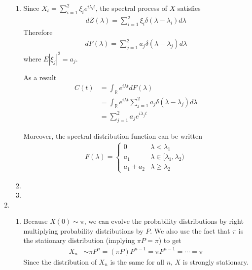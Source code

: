 \documentclass[12pt]{article}
\theoremstyle{plain}
\theoremstyle{definition}
\theoremstyle{remark}
\begin{document}
\begin{enumerate}
\begin{enumerate}
      \item %
        Since $X_t = \sum^2_{i=1}\xi_i e^{i\lambda_i t}$,
        the spectral process of $X$ satisfies
        \begin{align*}
          dZ(\lambda) = \sum^2_{i=1} \xi_i \delta(\lambda -\lambda_i) d\lambda
        \end{align*}
        Therefore
        \begin{align*}
          dF(\lambda) = \sum^2_{j=1} a_j \delta(\lambda -\lambda_j) d\lambda
        \end{align*}
        where $E|\xi_j|^2 = a_j$.

        As a result
        \begin{align*}
          C(t) &= \int_\mathbb{R} e^{i\lambda t} dF(\lambda) \\
            &= \int_\mathbb{R} e^{i\lambda t}
              \sum^2_{j=1} a_j \delta(\lambda -\lambda_j) d\lambda \\
            &= \sum^2_{j=1} a_j e^{i\lambda_j t}
        \end{align*}

        Moreover, the spectral distribution function can be written
        \begin{align*}
         F(\lambda) =
          \begin{cases}
            0 & \lambda < \lambda_1 \\
            a_1 & \lambda \in [\lambda_1,\lambda_2)\\
            a_1+a_2 & \lambda \geq \lambda_2
          \end{cases}
        \end{align*}

      \item %
      \item %

    \end{enumerate}

  \item %
    \begin{enumerate}
      \item %
        Because $X(0)\sim \pi$, we can evolve the probability
        distributions by right multiplying probability distributions by
        $P$. We also use the fact that $\pi$ is the stationary
        distribution (implying $\pi P = \pi$) to get
        \begin{align*}
          X_n &\sim \pi P^n = (\pi P)P^{n-1} = \pi P^{n-1} = \cdots = \pi
        \end{align*}
        Since the distribution of $X_n$ is the same for all $n$, $X$ is
        strongly stationary.


\end{enumerate}
\end{enumerate}
\end{document}

